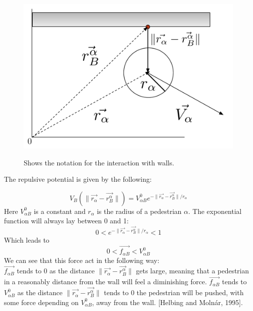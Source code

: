 \begin{figure}[ht]
\centering
{\includegraphics[scale=0.35]{Figures/NotationOfWall.pdf}} 
\caption{\small{Shows the notation for the interaction with walls.}}
\label{NotationOfWall}
\end{figure}

The repulsive potential is given by the following:

\begin{equation}
V_{B} \left( \| \vec{r_{\alpha}} - \vec{r_{B}^{\alpha}} \| \right) =
V^0_{\alpha B} e^{- \| \vec{r_{\alpha}} - \vec{r_{B}^{\alpha}} \| / r_{\alpha} }
\end{equation}
Here $V^0_{\alpha B}$ is a constant and $r_{\alpha}$ is the radius of a pedestrian $\alpha$. The exponential function will always lay between 0 and 1:
\begin{equation}
0 < e^{ -\| \vec{r_{\alpha}} - \vec{r_{B}^{\alpha}} \| /r_\alpha} < 1
\end{equation}
Which leads to
\begin{equation}
0< \vec{f_{\alpha B}} < V^0_{\alpha B}
\end{equation}
We can see that this force act in the following way:\\
$\vec{f_{\alpha B}}$ tends to 0 as the distance $ \| \vec{r_{\alpha}} - \vec{r_{B}^{\alpha}} \|$ gets large, meaning that a pedestrian in a reasonably distance from the wall will feel a diminishing force. $\vec{f_{\alpha B}}$ tends to $V^0_{\alpha B}$ as the distance $ \| \vec{r_{\alpha}} - \vec{r_{B}^{\alpha}} \|$ tends to $0$ the pedestrian will be pushed, with some force depending on $V^0_{\alpha B}$, away from the wall. 
 [Helbing and Molnár, 1995]. %


